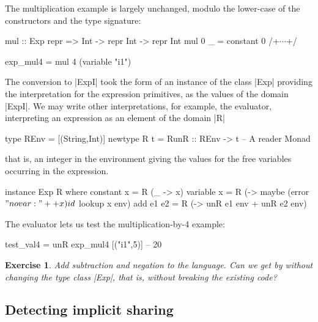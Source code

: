 \documentclass[submission,copyright,creativecommons]{eptcs}
\newtheorem{Exercise}{Exercise} \newcommand\aside[1]{}
\begin{document}
The multiplication example is largely unchanged, modulo the lower-case
of the constructors and the type signature:
\begin{code}
mul :: Exp repr => Int -> repr Int -> repr Int
mul 0 _ = constant 0
/+\vspace{-15pt}$\cdots$+/

exp_mul4 = mul 4 (variable "i1")
\end{code}

The conversion to |ExpI| took the form of an instance of the class
|Exp| providing the interpretation for the expression primitives, as
the values of the domain |ExpI|. We may write other interpretations,
for example, the evaluator, interpreting an expression as an element
of the domain |R|
\begin{code}
type REnv = [(String,Int)]
newtype R t = R{unR :: REnv -> t} -- A reader Monad
\end{code}
that is, an integer in the environment giving the values for
the free variables occurring in the expression.
\begin{code}
instance Exp R where
  constant x = R (\_ -> x)
  variable x = R (\env -> maybe (error $ "no var: " ++ x) id $ lookup x env)
  add e1 e2  = R (\env -> unR e1 env + unR e2 env)
\end{code}
The evaluator lets us test the multiplication-by-4 example:
\begin{code}
test_val4 = unR exp_mul4 [("i1",5)] -- 20
\end{code}

\begin{Exercise}
Add subtraction and negation to the language. Can we get by without
changing the type class |Exp|, that is, without breaking the existing
code?
\end{Exercise}


\subsection{Detecting implicit sharing}
\end{document}
